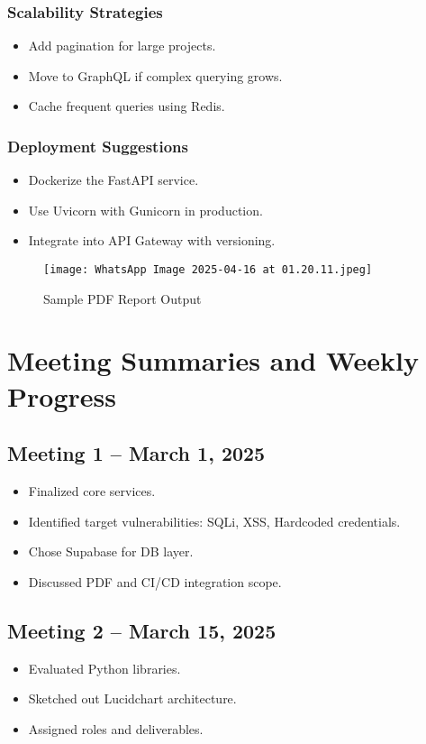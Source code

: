 \documentclass{article}
\begin{document}
\subsubsection{Scalability Strategies}
\begin{itemize}
    \item Add pagination for large projects.
    \item Move to GraphQL if complex querying grows.
    \item Cache frequent queries using Redis.
\end{itemize}

\subsubsection{Deployment Suggestions}
\begin{itemize}
    \item Dockerize the FastAPI service.
    \item Use Uvicorn with Gunicorn in production.
    \item Integrate into API Gateway with versioning.
\end{itemize}

\begin{figure}[h!]
\centering
\texttt{[image: WhatsApp Image 2025-04-16 at 01.20.11.jpeg]}
\caption{Sample PDF Report Output}
\end{figure}

\section{Meeting Summaries and Weekly Progress}

\subsection{Meeting 1 – March 1, 2025}
\begin{itemize}
    \item Finalized core services.
    \item Identified target vulnerabilities: SQLi, XSS, Hardcoded credentials.
    \item Chose Supabase for DB layer.
    \item Discussed PDF and CI/CD integration scope.
\end{itemize}

\subsection{Meeting 2 – March 15, 2025}
\begin{itemize}
    \item Evaluated Python libraries.
    \item Sketched out Lucidchart architecture.
    \item Assigned roles and deliverables.
\end{itemize}
\end{document}
